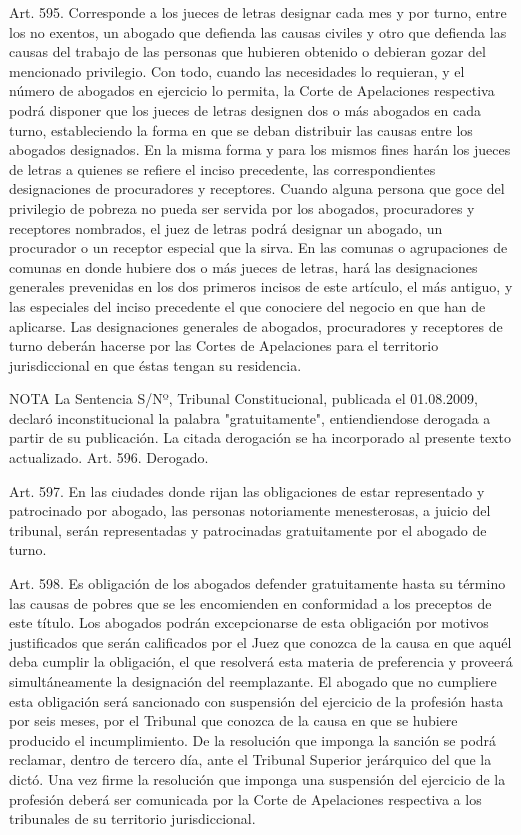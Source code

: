     Art. 595. Corresponde a los jueces de letras designar cada mes y por turno, entre los no exentos, un abogado que defienda las causas civiles y otro que defienda las causas del trabajo de las personas que hubieren obtenido o debieran gozar del mencionado privilegio. Con todo, cuando las necesidades lo requieran, y el número de abogados en ejercicio lo permita, la Corte de Apelaciones respectiva podrá disponer que los jueces de letras designen dos o más abogados en cada turno, estableciendo la forma en que se deban distribuir las causas entre los abogados designados.
    En la misma forma y para los mismos fines harán los jueces de letras a quienes se refiere el inciso precedente, las correspondientes designaciones de procuradores y receptores.
    Cuando alguna persona que goce del privilegio de pobreza no pueda ser servida por los abogados, procuradores y receptores nombrados, el juez de letras podrá designar un abogado, un procurador o un receptor especial que la sirva.
    En las comunas o agrupaciones de comunas en donde hubiere dos o más jueces de letras, hará las designaciones generales prevenidas en los dos primeros incisos de este artículo, el más antiguo, y las especiales del inciso precedente el que conociere del negocio en que han de aplicarse.
    Las designaciones generales de abogados, procuradores y receptores de turno deberán hacerse por las Cortes de Apelaciones para el territorio jurisdiccional en que éstas tengan su residencia.




NOTA
      La Sentencia S/Nº, Tribunal Constitucional, publicada el 01.08.2009, declaró inconstitucional la palabra "gratuitamente", entiendiendose derogada a partir de su publicación. La citada derogación se ha incorporado al presente texto actualizado.
    Art. 596. Derogado.



    Art. 597. En las ciudades donde rijan las obligaciones de estar representado y patrocinado por abogado, las personas notoriamente menesterosas, a juicio del tribunal, serán representadas y patrocinadas gratuitamente por el abogado de turno.


    Art. 598. Es obligación de los abogados defender gratuitamente hasta su término las causas de pobres que se les encomienden en conformidad a los preceptos de este título.
    Los abogados podrán excepcionarse de esta obligación por motivos justificados que serán calificados por el Juez que conozca de la causa en que aquél deba cumplir la obligación, el que resolverá esta materia de preferencia y proveerá simultáneamente la designación del reemplazante.
    El abogado que no cumpliere esta obligación será sancionado con suspensión del ejercicio de la profesión hasta por seis meses, por el Tribunal que conozca de la causa en que se hubiere producido el incumplimiento.
    De la resolución que imponga la sanción se podrá reclamar, dentro de tercero día, ante el Tribunal Superior jerárquico del que la dictó.
    Una vez firme la resolución que imponga una suspensión del ejercicio de la profesión deberá ser comunicada por la Corte de Apelaciones respectiva a los tribunales de su territorio jurisdiccional.



